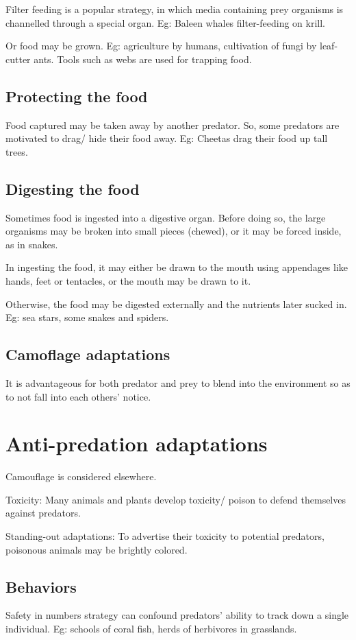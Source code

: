 \documentclass[oneside, article]{memoir}
\begin{document}
Filter feeding is a popular strategy, in which media containing prey organisms is channelled through a special organ. Eg: Baleen whales filter-feeding on krill.

Or food may be grown. Eg: agriculture by humans, cultivation of fungi by leaf-cutter ants.
Tools such as webs are used for trapping food.

\subsection{Protecting the food}
Food captured may be taken away by another predator. So, some predators are motivated to drag/ hide their food away. Eg: Cheetas drag their food up tall trees.

\subsection{Digesting the food}
Sometimes food is ingested into a digestive organ. Before doing so, the large organisms may be broken into small pieces (chewed), or it may be forced inside, as in snakes.

In ingesting the food, it may either be drawn to the mouth using appendages like hands, feet or tentacles, or the mouth may be drawn to it.

Otherwise, the food may be digested externally and the nutrients later sucked in. Eg: sea stars, some snakes and spiders.

\subsection{Camoflage adaptations}
It is advantageous for both predator and prey to blend into the environment so as to not fall into each others’ notice.

\section{Anti-predation adaptations}
Camouflage is considered elsewhere.

Toxicity: Many animals and plants develop toxicity/ poison to defend themselves against predators. 

Standing-out adaptations: To advertise their toxicity to potential predators, poisonous animals may be brightly colored.

\subsection{Behaviors}
Safety in numbers strategy can confound predators’ ability to track down a single individual. Eg: schools of coral fish, herds of herbivores in grasslands.
\end{document}
